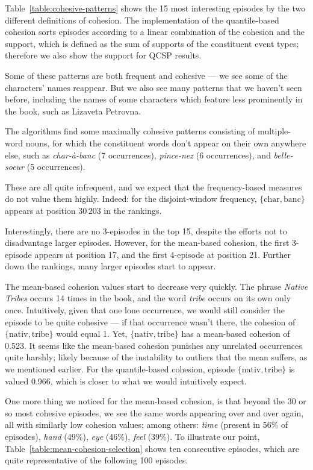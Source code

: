 Table~\ref{table:cohesive-patterns} shows the 15 most interesting episodes by the two different definitions of cohesion. The implementation of the quantile-based cohesion sorts episodes according to a linear combination of the cohesion and the support, which is defined as the sum of supports of the constituent event types; therefore we also show the support for QCSP results.

Some of these patterns are both frequent and cohesive --- we see some of the characters' names reappear. But we also see many patterns that we haven't seen before, including the names of some characters which feature less prominently in the book, such as Lizaveta Petrovna.

The algorithms find some maximally cohesive patterns consisting of multiple-word nouns, for which the constituent words don't appear on their own anywhere else, such as \emph{char-à-banc} (7 occurrences), \emph{pince-nez} (6 occurrences), and \emph{belle-soeur} (5 occurrences).

These are all quite infrequent, and we expect that the frequency-based measures do not value them highly. Indeed: for the disjoint-window frequency, $ \{ \text{char},\allowbreak \text{banc} \} $ appears at position $ 30\,203 $ in the rankings.

Interestingly, there are no 3-episodes in the top 15, despite the efforts not to disadvantage larger episodes. However, for the mean-based cohesion, the first 3-episode appears at position 17, and the first 4-episode at position 21. Further down the rankings, many larger episodes start to appear.

The mean-based cohesion values start to decrease very quickly. The phrase \emph{Native Tribes} occurs 14 times in the book, and the word \emph{tribe} occurs on its own only once. Intuitively, given that one lone occurrence, we would still consider the episode to be quite cohesive --- if that occurrence wasn't there, the cohesion of $ \{ \text{nativ}, \text{tribe} \} $ would equal 1. Yet, $ \{ \text{nativ}, \text{tribe} \} $ has a mean-based cohesion of 0.523. It seems like the mean-based cohesion punishes any unrelated occurrences quite harshly; likely because of the instability to outliers that the mean suffers, as we mentioned earlier. For the quantile-based cohesion, episode $ \{ \text{nativ}, \text{tribe} \} $ is valued 0.966, which is closer to what we would intuitively expect.

One more thing we noticed for the mean-based cohesion, is that beyond the 30 or so most cohesive episodes, we see the same words appearing over and over again, all with similarly low cohesion values; among others: \emph{time} (present in 56\% of episodes), \emph{hand} (49\%), \emph{eye} (46\%), \emph{feel} (39\%). To illustrate our point, Table~\ref{table:mean-cohesion-selection} shows ten consecutive episodes, which are quite representative of the following 100 episodes.

